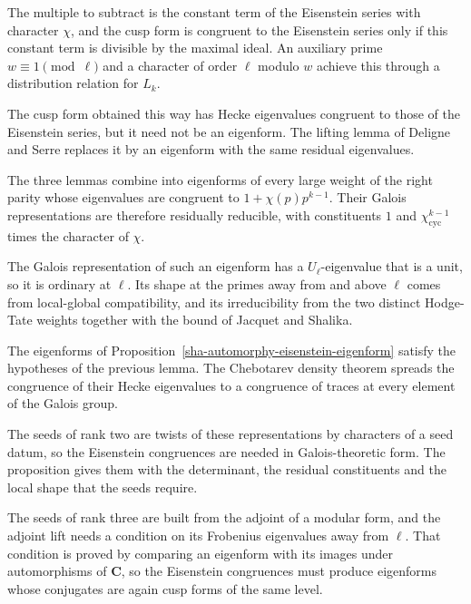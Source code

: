 The multiple to subtract is the constant term of the Eisenstein series with character $\chi$, and the cusp form is congruent to the Eisenstein series only if this constant term is divisible by the maximal ideal. An auxiliary prime $w\equiv1\pmod\ell$ and a character of order $\ell$ modulo $w$ achieve this through a distribution relation for $L_k$.

The cusp form obtained this way has Hecke eigenvalues congruent to those of the Eisenstein series, but it need not be an eigenform. The lifting lemma of Deligne and Serre replaces it by an eigenform with the same residual eigenvalues.

The three lemmas combine into eigenforms of every large weight of the right parity whose eigenvalues are congruent to $1+\chi(p)p^{k-1}$. Their Galois representations are therefore residually reducible, with constituents $1$ and $\chi_{\mathrm{cyc}}^{k-1}$ times the character of $\chi$.

The Galois representation of such an eigenform has a $U_\ell$-eigenvalue that is a unit, so it is ordinary at $\ell$. Its shape at the primes away from and above $\ell$ comes from local-global compatibility, and its irreducibility from the two distinct Hodge-Tate weights together with the bound of Jacquet and Shalika.

The eigenforms of Proposition~\ref{sha-automorphy-eisenstein-eigenform} satisfy the hypotheses of the previous lemma. The Chebotarev density theorem spreads the congruence of their Hecke eigenvalues to a congruence of traces at every element of the Galois group.

The seeds of rank two are twists of these representations by characters of a seed datum, so the Eisenstein congruences are needed in Galois-theoretic form. The proposition gives them with the determinant, the residual constituents and the local shape that the seeds require.

The seeds of rank three are built from the adjoint of a modular form, and the adjoint lift needs a condition on its Frobenius eigenvalues away from $\ell$. That condition is proved by comparing an eigenform with its images under automorphisms of $\mathbf C$, so the Eisenstein congruences must produce eigenforms whose conjugates are again cusp forms of the same level.

